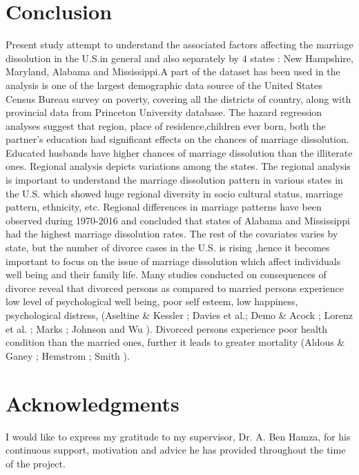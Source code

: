 \documentclass[10pt,twocolumn]{article}
\begin{document}
\section{Conclusion}
Present study attempt to understand the associated factors affecting the marriage dissolution in the U.S.in general and also separately by 4 states : New Hampshire, Maryland, Alabama and Mississippi.A part of the dataset has been used in the analysis is one of the largest demographic data source of the United States Census Bureau survey on poverty, covering all the districts of country, along with provincial data from Princeton University database. The hazard regression analyses suggest that  region, place of residence,children ever born, both the partner’s education had significant effects on the chances of marriage dissolution. Educated husbands have higher chances of marriage dissolution than the illiterate ones. Regional analysis depicts variations among the states. The regional analysis is important to understand the marriage dissolution pattern in various states in the U.S. which showed huge regional diversity in socio cultural status,  marriage pattern, ethnicity, etc. Regional differences in marriage patterns have been observed during 1970-2016 and concluded that states of Alabama and Mississippi had the highest marriage dissolution rates. The rest of the covariates varies by state, but the number of divorce cases in the U.S. is rising ,hence it becomes important to focus on the issue of marriage dissolution which affect individuals well being and their family life. Many studies conducted on consequences of divorce reveal that divorced persons as compared to married persons experience low level of psychological well being, poor self esteem, low happiness, psychological distress, (Aseltine \& Kessler \cite{aseltine1993marital}; Davies et al.\cite{scherzinger1997huntingtin}; Demo \& Acock \cite{david1996family}; Lorenz et al. \cite{lorenz1997cognitive}; Marks \cite{marks1996european}; Johnson and Wu \cite{johnson2002empirical}). Divorced persons experience poor health condition than the married ones, further it leads to greater mortality (Aldous \& Ganey \cite{aldous1999family}; Hemstrom \cite{hemstrom1996marriage}; Smith \cite{smith2008social} ).
\section*{Acknowledgments}
I would like to express my gratitude to my supervisor, Dr. A. Ben Hamza, for his continuous support, motivation and advice he has provided throughout the time of the project. 

\end{document}
